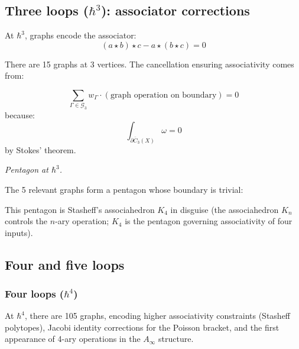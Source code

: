 \subsection{\texorpdfstring{Three loops ($\hbar^3$): associator corrections}{Three loops (3): associator corrections}}

At $\hbar^3$, graphs encode the associator:
\[(a \star b) \star c - a \star (b \star c) = 0\]

There are 15 graphs at 3 vertices. The cancellation ensuring associativity comes from:

\begin{theorem}
\label{thm:stokes-associativity}
\[\sum_{\Gamma \in \mathcal{G}_3} w_\Gamma \cdot (\text{graph operation on boundary}) = 0\]
because:
\[\int_{\partial \overline{C}_3(X)} \omega = 0\]
by Stokes' theorem.
\end{theorem}

\emph{Pentagon at $\hbar^3$.}

The 5 relevant graphs form a pentagon whose boundary is trivial:
\begin{center}
\end{center}

This pentagon is Stasheff's associahedron $K_4$ in disguise (the associahedron $K_n$ controls the $n$-ary operation; $K_4$ is the pentagon governing associativity of four inputs).

\subsection{Four and five loops}

\subsubsection{\texorpdfstring{Four loops ($\hbar^4$)}{Four loops (4)}}

At $\hbar^4$, there are 105 graphs, encoding higher associativity constraints (Stasheff polytopes), Jacobi identity corrections for the Poisson bracket, and the first appearance of 4-ary operations in the $A_\infty$ structure.

